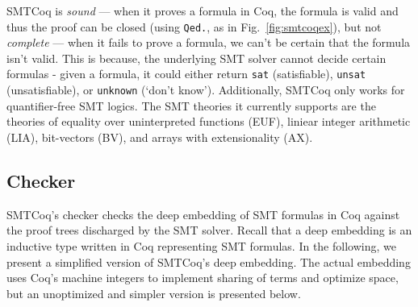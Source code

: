\documentclass{article}
\begin{document}
	SMTCoq is \textit{sound} ---
	when it proves a formula in Coq, the 
	formula is valid and thus the proof
	can be closed (using \texttt{Qed.},
	as in Fig.~\ref{fig:smtcoqex}), but 
	not \textit{complete} --- when it 
	fails to prove a formula, we can't 
	be certain that the formula isn't 
	valid. This is because, the underlying 
	SMT solver cannot decide certain 
	formulas - given a formula, it could 
	either return \texttt{sat} 
	(satisfiable), \texttt{unsat} 
	(unsatisfiable), or 
	\texttt{unknown} (`don't know').
	Additionally, SMTCoq only works for 
	quantifier-free SMT logics. The 
	SMT theories it currently supports 
	are the theories of equality over
	uninterpreted functions (EUF), 
	liniear integer arithmetic (LIA),
	bit-vectors (BV), and arrays with
	extensionality (AX).
	
	\subsection{Checker}
	\label{sec:checker}
	SMTCoq's checker checks the deep embedding
	of SMT formulas in Coq against the 
	proof trees discharged by the SMT solver.
	Recall that a deep embedding is an
	inductive type written in 
	Coq representing SMT formulas. 
	In the following, we present 
	a simplified version of SMTCoq's 
	deep embedding. The actual embedding 
	uses Coq's machine integers to 
	implement sharing of terms and 
	optimize space, but an unoptimized 
	and simpler version is presented 
	below. 
	
\end{document}
